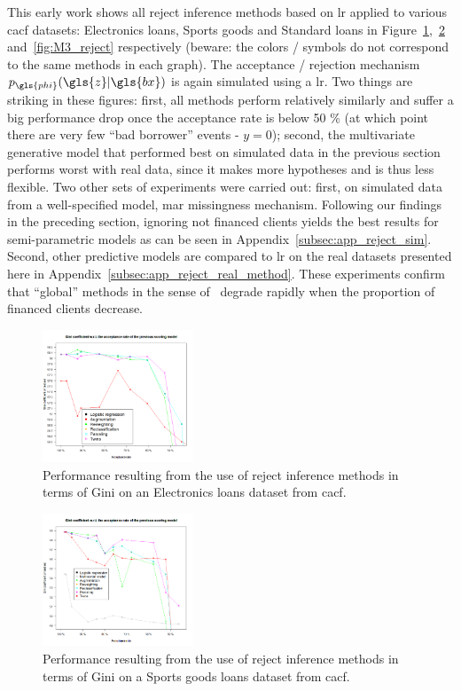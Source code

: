 This early work shows all reject inference methods based on \gls{lr} applied to various \gls{cacf} datasets: Electronics loans, Sports goods and Standard loans in Figure~\ref{fig:darty_reject},~\ref{fig:decathlon_reject} and~\ref{fig:M3_reject} respectively (beware: the colors / symbols do not correspond to the same methods in each graph). The acceptance / rejection mechanism $p_{\gls{phi}}(\gls{z} | \gls{bx})$ is again simulated using a \gls{lr}. Two things are striking in these figures: first, all methods perform relatively similarly and suffer a big performance drop once the acceptance rate is below 50 \% (at which point there are very few ``bad borrower'' events - $y = 0$); second, the multivariate generative model that performed best on simulated data in the previous section performs worst with real data, since it makes more hypotheses and is thus less flexible. Two other sets of experiments were carried out: first, on simulated data from a well-specified model, \gls{mar} missingness mechanism. Following our findings in the preceding section, ignoring not financed clients yields the best results for semi-parametric models as can be seen in Appendix~\ref{subsec:app_reject_sim}. Second, other predictive models are compared to \gls{lr} on the real datasets presented here in Appendix~\ref{subsec:app_reject_real_method}. These experiments confirm that ``global'' methods in the sense of~\cite{} degrade rapidly when the proportion of financed clients decrease.

\begin{figure}[H]
\centering
\includegraphics[width=0.4\textwidth]{figures/appendix/rejectinferencedarty3.png}
\caption{Performance resulting from the use of reject inference methods in terms of Gini on an Electronics loans dataset from \gls{cacf}.}
\label{fig:darty_reject}
\end{figure}

\begin{figure}[H]
\centering
\includegraphics[width=0.4\textwidth]{figures/appendix/rejectinferencedecathlon.png}
\caption{Performance resulting from the use of reject inference methods in terms of Gini on a Sports goods loans dataset from \gls{cacf}.}
\label{fig:decathlon_reject}
\end{figure}

